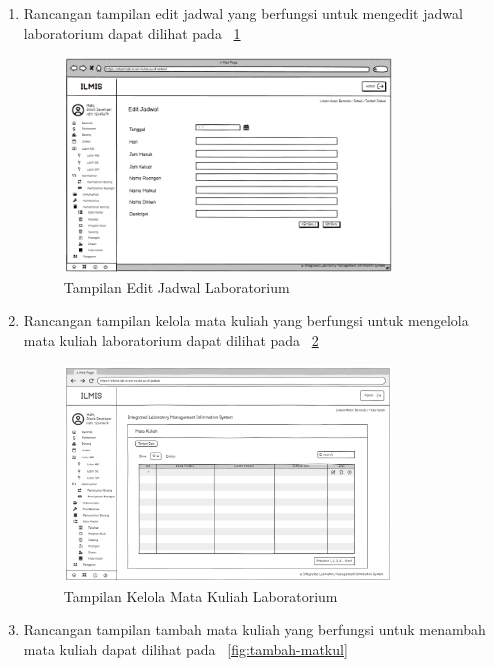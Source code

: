 \begin{enumerate}
	\item Rancangan tampilan edit jadwal yang berfungsi untuk mengedit jadwal laboratorium dapat dilihat pada \pic~\ref{fig:edit-jadwal}
	      \begin{figure}
		      \centering
		      \includegraphics[width=0.82\textwidth]{konten/gambar/user interface/edit-jadwal.png}
		      \caption{Tampilan Edit Jadwal Laboratorium}
		      \label{fig:edit-jadwal}
	      \end{figure}
	\item Rancangan tampilan kelola mata kuliah yang berfungsi untuk mengelola mata kuliah laboratorium dapat dilihat pada \pic~\ref{fig:matkul}
	      \begin{figure}
		      \centering
		      \includegraphics[width=0.82\textwidth]{konten/gambar/user interface/ui-matkul.png}
		      \caption{Tampilan Kelola Mata Kuliah Laboratorium}
		      \label{fig:matkul}
	      \end{figure}
	\item Rancangan tampilan tambah mata kuliah yang berfungsi untuk menambah mata kuliah dapat dilihat pada \pic~\ref{fig:tambah-matkul}
	      \begin{figure}

\end{figure}
\end{enumerate}
